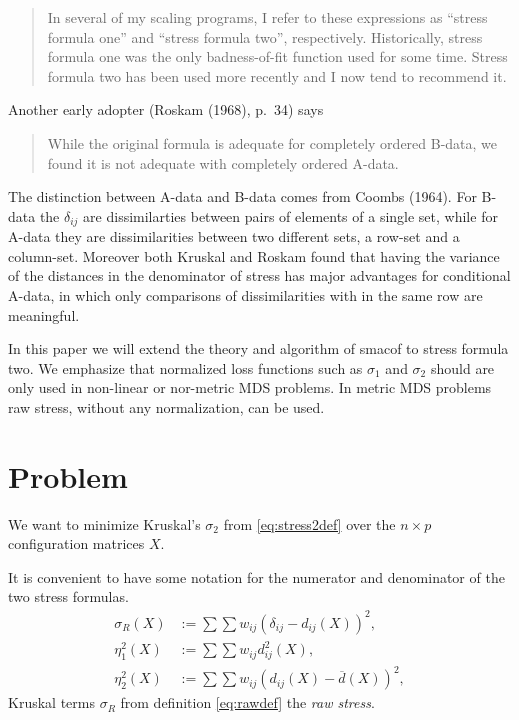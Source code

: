 \documentclass[
  12pt,
]{article}
\theoremstyle{definition}
\theoremstyle{definition}
\theoremstyle{definition}
\theoremstyle{definition}
\theoremstyle{remark}
\begin{document}
\begin{quote}
In several of my scaling programs, I refer to these expressions
as ``stress formula one'' and ``stress formula two'', respectively.
Historically, stress formula one was the only badness-of-fit
function used for some time. Stress formula two has been used
more recently and I now tend to recommend it.
\end{quote}

Another early adopter (Roskam (1968), p.~34) says

\begin{quote}
While the original formula is adequate for completely ordered
B-data, we found it is not adequate with completely ordered
A-data.
\end{quote}

The distinction between A-data and B-data comes from Coombs (1964).
For B-data the \(\delta_{ij}\) are dissimilarties
between pairs of elements of a single set, while for A-data they
are dissimilarities between two different sets, a row-set and a column-set.
Moreover both Kruskal and Roskam found that having the variance
of the distances in the denominator of stress has major advantages
for conditional A-data, in which only comparisons of dissimilarities
with in the same row are meaningful.

In this paper we will extend the theory and algorithm of smacof
to stress formula two. We emphasize that normalized loss functions
such as \(\sigma_1\) and \(\sigma_2\) should are only
used in non-linear or nor-metric MDS problems. In metric MDS problems
raw stress, without any normalization, can be used.

\section{Problem}\label{problem}

We want to minimize Kruskal's \(\sigma_2\) from \eqref{eq:stress2def}
over the \(n\times p\) configuration matrices \(X\).

It is convenient to have some notation for the numerator and denominator of the two stress formulas.
\begin{subequations}
\begin{align}
\sigma_R(X)&:=\sum\sum w_{ij}(\delta_{ij}-d_{ij}(X))^2,\label{eq:rawdef}\\
\eta_1^2(X)&:=\sum\sum w_{ij}d_{ij}^2(X),\label{eq:eta1def}\\
\eta_2^2(X)&:=\sum\sum w_{ij}(d_{ij}(X)-\overline{d}(X))^2,\label{eq:eta2def}
\end{align}
\end{subequations}
Kruskal terms \(\sigma_R\) from definition \eqref{eq:rawdef} the \emph{raw stress}.
\end{document}
